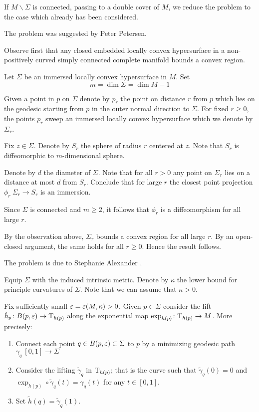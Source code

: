 If $M\backslash\Sigma$ is connected,
passing to a double cover of $M$,
we reduce the problem to the case which already has been considered.\qeds

The problem was suggested by Peter Petersen.



Observe first that any closed embedded locally convex hypersurface in a non-positively curved simply connected complete manifold bounds a convex region.


Let $\Sigma$ be an immersed locally convex hypersurface in $M$.
Set 
\[m=\dim \Sigma=\dim M-1\]

Given a point in $p$ on $\Sigma$ 
denote by $p_r$ the point on distance $r$ from $p$
which lies on the geodesic starting from $p$ in the outer normal direction to $\Sigma$.
For fixed $r\ge 0$,
the points $p_r$ sweep an immersed locally convex hypersurface which we denote by $\Sigma_r$.

Fix $z\in \Sigma$.
Denote by $S_r$ the sphere of radius $r$ centered at $z$.
Note that $S_r$ is diffeomorphic to $m$-dimensional sphere.

Denote by $d$ the diameter of $\Sigma$.
Note that for all $r>0$
any point on $\Sigma_r$
lies on a distance at most $d$ from $S_r$.
Conclude that for large $r$ the closest point projection $\phi_r\:\Sigma_r\to S_r$ is an immersion.


Since $\Sigma$ is connected
and $m\ge 2$, it follows that $\phi_r$ is a diffeomorphism for all large $r$.

By the observation above, $\Sigma_r$ bounds a convex region for all large $r$.
By an open-closed argument, the same holds for all $r\ge 0$.
Hence the result follows.\qeds

The problem is due to Stephanie Alexander \cite[see][]{alexander}.



Equip $\Sigma$ with the induced intrinsic metric.
Denote by $\kappa$ the lower bound for principle curvatures of $\Sigma$.
Note that we can assume that $\kappa>0$.

Fix sufficiently small $\varepsilon=\varepsilon(M,\kappa)>0$.
Given $p\in \Sigma$ consider the lift $\tilde h_p\colon B(p,\varepsilon)\to \mathrm{T}_{h(p)}$ along the exponential map $\exp_{h(p)}\colon\mathrm{T}_{h(p)}\to M$.
More precisely:
\begin{enumerate}
\item Connect each point $q\in B(p,\varepsilon)\subset \Sigma$ to $p$
by a minimizing geodesic  path $\gamma_q\:[0,1]\to \Sigma$
\item Consider the lifting $\tilde\gamma_q$ in $\mathrm{T}_{h(p)}$; 
that is the curve such that $\tilde\gamma_q(0)=0$ and $\exp_{h(p)}\circ\tilde\gamma_q(t)=\gamma_q(t)$ for any $t\in[0,1]$.
 \item Set $\tilde h(q)=\tilde\gamma_q(1)$.
\end{enumerate}

